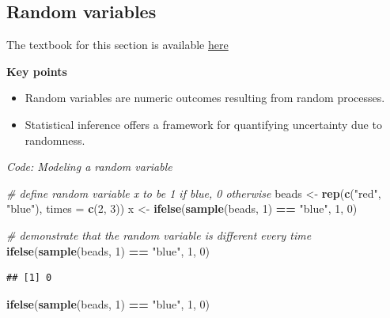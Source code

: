 \documentclass[
]{article}
\newenvironment{Shaded}{\begin{snugshade}}{\end{snugshade}}
\newcommand{\CommentTok}[1]{\textcolor[rgb]{0.56,0.35,0.01}{\textit{#1}}}
\newcommand{\DataTypeTok}[1]{\textcolor[rgb]{0.13,0.29,0.53}{#1}}
\newcommand{\DecValTok}[1]{\textcolor[rgb]{0.00,0.00,0.81}{#1}}
\newcommand{\KeywordTok}[1]{\textcolor[rgb]{0.13,0.29,0.53}{\textbf{#1}}}
\newcommand{\NormalTok}[1]{#1}
\newcommand{\OperatorTok}[1]{\textcolor[rgb]{0.81,0.36,0.00}{\textbf{#1}}}
\newcommand{\StringTok}[1]{\textcolor[rgb]{0.31,0.60,0.02}{#1}}
\providecommand{\tightlist}{%
  \setlength{\itemsep}{0pt}\setlength{\parskip}{0pt}}
\begin{document}
\hypertarget{random-variables}{%
\subsection{Random variables}\label{random-variables}}

The textbook for this section is available
\href{https://rafalab.github.io/dsbook/random-variables.html\#random-variables-1}{here}

\textbf{Key points}

\begin{itemize}
\tightlist
\item
  Random variables are numeric outcomes resulting from random processes.
\item
  Statistical inference offers a framework for quantifying uncertainty
  due to randomness.
\end{itemize}

\emph{Code: Modeling a random variable}

\begin{Shaded}
\begin{Highlighting}[]
\CommentTok{\# define random variable x to be 1 if blue, 0 otherwise}
\NormalTok{beads \textless{}{-}}\StringTok{ }\KeywordTok{rep}\NormalTok{(}\KeywordTok{c}\NormalTok{(}\StringTok{"red"}\NormalTok{, }\StringTok{"blue"}\NormalTok{), }\DataTypeTok{times =} \KeywordTok{c}\NormalTok{(}\DecValTok{2}\NormalTok{, }\DecValTok{3}\NormalTok{))}
\NormalTok{x \textless{}{-}}\StringTok{ }\KeywordTok{ifelse}\NormalTok{(}\KeywordTok{sample}\NormalTok{(beads, }\DecValTok{1}\NormalTok{) }\OperatorTok{==}\StringTok{ "blue"}\NormalTok{, }\DecValTok{1}\NormalTok{, }\DecValTok{0}\NormalTok{)}

\CommentTok{\# demonstrate that the random variable is different every time}
\KeywordTok{ifelse}\NormalTok{(}\KeywordTok{sample}\NormalTok{(beads, }\DecValTok{1}\NormalTok{) }\OperatorTok{==}\StringTok{ "blue"}\NormalTok{, }\DecValTok{1}\NormalTok{, }\DecValTok{0}\NormalTok{)}
\end{Highlighting}
\end{Shaded}

\begin{verbatim}
## [1] 0
\end{verbatim}

\begin{Shaded}
\begin{Highlighting}[]
\KeywordTok{ifelse}\NormalTok{(}\KeywordTok{sample}\NormalTok{(beads, }\DecValTok{1}\NormalTok{) }\OperatorTok{==}\StringTok{ "blue"}\NormalTok{, }\DecValTok{1}\NormalTok{, }\DecValTok{0}\NormalTok{)}
\end{Highlighting}
\end{Shaded}
\end{document}

